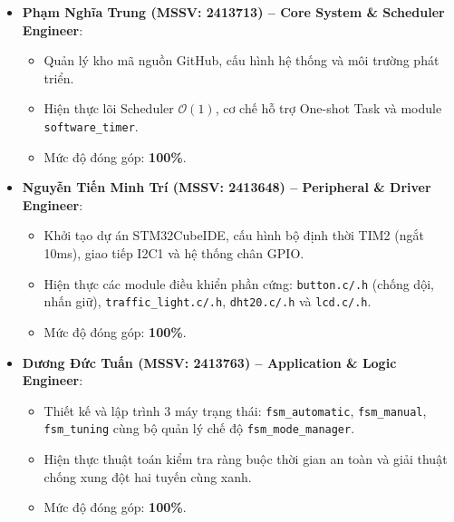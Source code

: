 \begin{itemize}
    \item \textbf{Phạm Nghĩa Trung (MSSV: 2413713) -- Core System \& Scheduler Engineer}:
    \begin{itemize}
        \item Quản lý kho mã nguồn GitHub, cấu hình hệ thống và môi trường phát triển.
        \item Hiện thực lõi Scheduler $\mathcal{O}(1)$, cơ chế hỗ trợ One-shot Task và module \texttt{software\_timer}.
        \item Mức độ đóng góp: \textbf{100\%}.
    \end{itemize}
    \item \textbf{Nguyễn Tiến Minh Trí (MSSV: 2413648) -- Peripheral \& Driver Engineer}:
    \begin{itemize}
        \item Khởi tạo dự án STM32CubeIDE, cấu hình bộ định thời TIM2 (ngắt 10ms), giao tiếp I2C1 và hệ thống chân GPIO.
        \item Hiện thực các module điều khiển phần cứng: \texttt{button.c/.h} (chống dội, nhấn giữ), \texttt{traffic\_light.c/.h}, \texttt{dht20.c/.h} và \texttt{lcd.c/.h}.
        \item Mức độ đóng góp: \textbf{100\%}.
    \end{itemize}
    \item \textbf{Dương Đức Tuấn (MSSV: 2413763) -- Application \& Logic Engineer}:
    \begin{itemize}
        \item Thiết kế và lập trình 3 máy trạng thái: \texttt{fsm\_automatic}, \texttt{fsm\_manual}, \texttt{fsm\_tuning} cùng bộ quản lý chế độ \texttt{fsm\_mode\_manager}.
        \item Hiện thực thuật toán kiểm tra ràng buộc thời gian an toàn và giải thuật chống xung đột hai tuyến cùng xanh.
        \item Mức độ đóng góp: \textbf{100\%}.
    \end{itemize}
\end{itemize}
